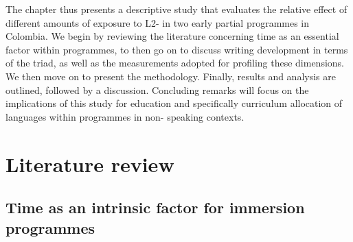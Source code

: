 \documentclass[output=paper]{langsci/langscibook}
\begin{document}
The chapter thus presents a descriptive study that evaluates the relative effect of different amounts of exposure to L2- in two early partial  programmes in Colombia. We begin by reviewing the literature concerning time as an essential factor within  programmes, to then go on to discuss writing development in terms of the  triad, as well as the measurements adopted for profiling these dimensions. We then move on to present the methodology. Finally, results and analysis are outlined, followed by a discussion. Concluding remarks will focus on the implications of this study for  education and specifically curriculum allocation of languages within  programmes in non- speaking contexts.

\section{Literature review}

\subsection{Time as an intrinsic factor for immersion programmes}
\end{document}
